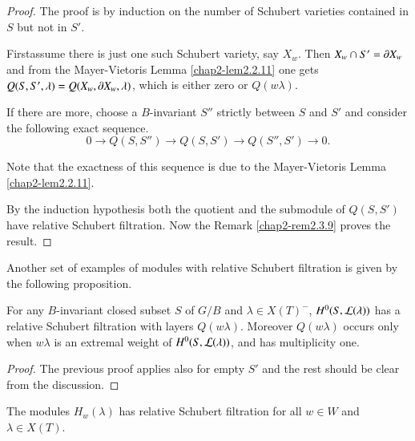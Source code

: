 \begin{proof}
The proof is by induction on the number of Schubert varieties
contained in $S$ but not in $S'$.

First\pageoriginale assume\label{page21} there is just one such Schubert variety,
say $X_{w}$. Then $X_{w}\cap S'=\partial X_{w}$ and from the Mayer-Vietoris
Lemma \ref{chap2-lem2.2.11} one gets $Q(S,S',\lambda)=Q(X_{w},\partial
X_{w},\lambda)$, which is either zero or $Q(w\lambda)$.

If there are more, choose a $B$-invariant $S''$ strictly between $S$
and $S'$ and consider the following exact sequence.
$$
0\to Q(S,S'')\to Q(S,S')\to Q(S'',S')\to 0.
$$

Note that the exactness of this sequence is due to the Mayer-Vietoris
Lemma \ref{chap2-lem2.2.11}.

By the induction hypothesis both the quotient and the submodule of
$Q(S,S')$ have relative Schubert filtration. Now the Remark
\ref{chap2-rem2.3.9} proves the result.
\end{proof}

Another set of examples of modules with relative Schubert filtration
is given by the following proposition.

\begin{proposition}\label{chap2-prop2.3.11}
For any $B$-invariant closed subset $S$ of $G/B$ and $\lambda \in
X(T)^{-}$, $H^{0}(S,\mathcal{L}(\lambda))$ has a relative Schubert filtration
with layers $Q(w\lambda)$. Moreover $Q(w\lambda)$ occurs only when
$w\lambda$ is an extremal weight of $H^{0}(S,\mathcal{L}(\lambda))$, and has
multiplicity one.
\end{proposition}

\begin{proof}
The previous proof applies also for empty $S'$ and the rest should be
clear from the discussion.
\end{proof}

\begin{corollary}\label{chap2-coro2.3.12}
The modules $H_{w}(\lambda)$ has relative Schubert filtration for all
$w\in W$ and $\lambda\in X(T)$.
\end{corollary}


